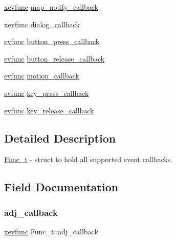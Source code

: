 \begin{DoxyCompactItemize}
\item 
\hyperlink{xwidget_8h_a9ef0263424a7f5f8f6b02055fca67ddd}{xevfunc} \hyperlink{structFunc__t_ac9c7609befbb46b122100a10f6984b9f}{map\+\_\+notify\+\_\+callback}
\item 
\hyperlink{xwidget_8h_a9ef0263424a7f5f8f6b02055fca67ddd}{xevfunc} \hyperlink{structFunc__t_a59e76f78a37d59efa847627774ce38e9}{dialog\+\_\+callback}
\item 
\hyperlink{xwidget_8h_ab4ae973f86a383c8c0f92b709044520a}{evfunc} \hyperlink{structFunc__t_aa58bc35a1499d8cd850d2a083ad016f1}{button\+\_\+press\+\_\+callback}
\item 
\hyperlink{xwidget_8h_ab4ae973f86a383c8c0f92b709044520a}{evfunc} \hyperlink{structFunc__t_a8cb9d8135a178027675c96599ff8312e}{button\+\_\+release\+\_\+callback}
\item 
\hyperlink{xwidget_8h_ab4ae973f86a383c8c0f92b709044520a}{evfunc} \hyperlink{structFunc__t_ac2842c834907f4aeace8f404c6cc7621}{motion\+\_\+callback}
\item 
\hyperlink{xwidget_8h_ab4ae973f86a383c8c0f92b709044520a}{evfunc} \hyperlink{structFunc__t_a024ea4919029156d9415f1501cd8b0bf}{key\+\_\+press\+\_\+callback}
\item 
\hyperlink{xwidget_8h_ab4ae973f86a383c8c0f92b709044520a}{evfunc} \hyperlink{structFunc__t_a8c7138616caa404a9af064d673d7e0f8}{key\+\_\+release\+\_\+callback}
\end{DoxyCompactItemize}


\subsection{Detailed Description}
\hyperlink{structFunc__t}{Func\+\_\+t} -\/ struct to hold all supported event callbacks. 

\subsection{Field Documentation}
\mbox{\label{structFunc__t_afe804d94b970050a9f85530408169623}} 
\subsubsection{\texorpdfstring{adj\+\_\+callback}{adj\_callback}}
{\footnotesize\ttfamily \hyperlink{xwidget_8h_a9ef0263424a7f5f8f6b02055fca67ddd}{xevfunc} Func\+\_\+t\+::adj\+\_\+callback}

